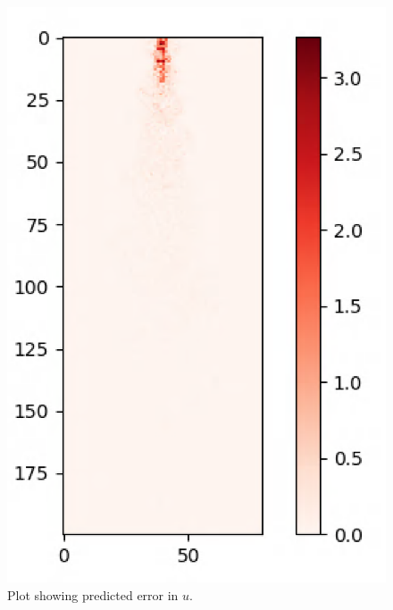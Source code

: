 \documentclass{article}
\begin{document}
\begin{figure}[h!]
    \centering
    \includegraphics[width = 0.85\linewidth]{figures/314_350_slices_pred.png}
    \caption{Plot showing predicted error in $u$.}
    \label{amr_err}
\end{figure}
\end{document}
